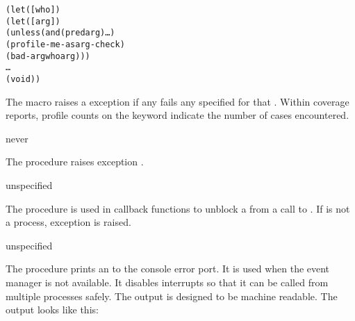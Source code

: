 \begin{syntax}
\end{syntax}
\expandsto{}\begin{alltt}\antipar
(let ([who ])
  (let ([arg ])
    (unless (and (pred arg) \ldots)
      (profile-me-as arg-check)
      (bad-arg who arg)))
  \ldots
  (void))\end{alltt}

The  macro raises a  exception if
any  fails any  specified for that .
Within coverage reports, profile counts on the 
keyword indicate the number of  cases encountered.

\begin{procedure}
\end{procedure}
\returns{} never

The  procedure raises exception .

\begin{procedure}
\end{procedure}
\returns{} unspecified

The  procedure is used in callback functions to
unblock a  from a call to . If
 is not a process, exception  is raised.

\begin{procedure}
\end{procedure}
\returns{} unspecified

The  procedure prints an  to
the console error port. It is used when the event manager is not
available. It disables interrupts so that it can be called from
multiple processes safely.  The output is designed to be machine
readable. The output looks like this:

